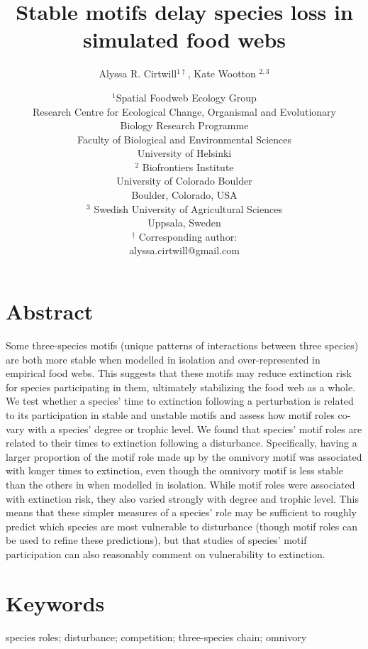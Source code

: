 \documentclass[12pt]{article}
\title{Stable motifs delay species loss in simulated food webs}
\author{Alyssa R. Cirtwill$^{1\dagger}$, Kate Wootton $^{2,3}$}
\date{\small$^1$Spatial Foodweb Ecology Group\\
Research Centre for Ecological Change, Organismal and Evolutionary\\
Biology Research Programme\\
Faculty of Biological and Environmental
Sciences\\
University of Helsinki\\
\medskip
\small$^2$ Biofrontiers Institute\\
University of Colorado Boulder\\
Boulder, Colorado, USA\\
\medskip
\small$^3$ Swedish University of Agricultural Sciences\\
Uppsala, Sweden\\
\medskip
$^\dagger$ Corresponding author:\\
alyssa.cirtwill@gmail.com\\
 }
\begin{document}
 
\maketitle 
\raggedright
\setlength{\parindent}{15pt} 

\clearpage
\linenumbers
\begin{spacing}{2.0}

\section*{Abstract} %
    Some three-species motifs (unique patterns of interactions between three species) are both more stable when modelled in isolation and over-represented in empirical food webs. This suggests that these motifs may reduce extinction risk for species participating in them, ultimately stabilizing the food web as a whole. 
    We test whether a species' time to extinction following a perturbation is related to its participation in stable and unstable motifs and assess how motif roles co-vary with a species' degree or trophic level.
    We found that species' motif roles are related to their times to extinction following a disturbance. Specifically, having a larger proportion of the motif role made up by the omnivory motif was associated with longer times to extinction, even though the omnivory motif is less stable than the others in when modelled in isolation.
    While motif roles were associated with extinction risk, they also varied strongly with degree and trophic level. This means that these simpler measures of a species' role may be sufficient to roughly predict which species are most vulnerable to disturbance (though motif roles can be used to refine these predictions), but that studies of species' motif participation can also reasonably comment on vulnerability to extinction. 

\section*{Keywords}

	species roles; disturbance; competition; three-species chain; omnivory


\end{spacing}
\end{document}
